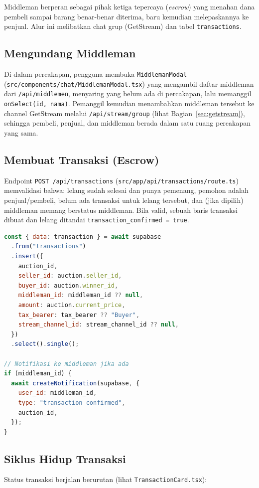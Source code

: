 Middleman berperan sebagai pihak ketiga tepercaya (\emph{escrow}) yang menahan
dana pembeli sampai barang benar-benar diterima, baru kemudian melepaskannya ke
penjual. Alur ini melibatkan chat grup (GetStream) dan tabel \texttt{transactions}.

\subsection{Mengundang Middleman}
Di dalam percakapan, pengguna membuka \texttt{MiddlemanModal}
(\texttt{src/components/chat/MiddlemanModal.tsx}) yang mengambil daftar middleman
dari \texttt{/api/middlemen}, menyaring yang belum ada di percakapan, lalu
memanggil \texttt{onSelect(id, nama)}. Pemanggil kemudian menambahkan middleman
tersebut ke channel GetStream melalui \texttt{/api/stream/group}
(lihat Bagian~\ref{sec:getstream}), sehingga pembeli, penjual, dan middleman
berada dalam satu ruang percakapan yang sama.

\subsection{Membuat Transaksi (Escrow)}
Endpoint \texttt{POST /api/transactions}
(\texttt{src/app/api/transactions/route.ts}) memvalidasi bahwa: lelang sudah
selesai dan punya pemenang, pemohon adalah penjual/pembeli, belum ada transaksi
untuk lelang tersebut, dan (jika dipilih) middleman memang berstatus middleman.
Bila valid, sebuah baris transaksi dibuat dan lelang ditandai
\texttt{transaction\_confirmed = true}.

\begin{lstlisting}[language=JavaScript,caption={Pembuatan baris transaksi (transactions/route.ts)}]
const { data: transaction } = await supabase
  .from("transactions")
  .insert({
    auction_id,
    seller_id: auction.seller_id,
    buyer_id: auction.winner_id,
    middleman_id: middleman_id ?? null,
    amount: auction.current_price,
    tax_bearer: tax_bearer ?? "Buyer",
    stream_channel_id: stream_channel_id ?? null,
  })
  .select().single();

// Notifikasi ke middleman jika ada
if (middleman_id) {
  await createNotification(supabase, {
    user_id: middleman_id,
    type: "transaction_confirmed",
    auction_id,
  });
}
\end{lstlisting}

\subsection{Siklus Hidup Transaksi}
Status transaksi berjalan berurutan (lihat \texttt{TransactionCard.tsx}):

